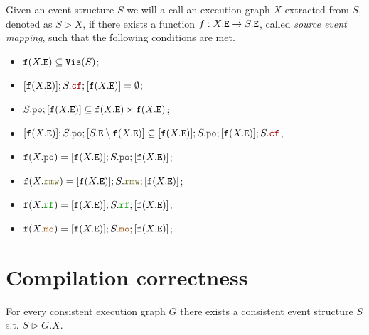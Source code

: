 \documentclass[12pt]{article}
\begin{document}
\begin{definition}
  Given an event structure $S$ we will a call an execution graph $X$
  extracted from $S$, denoted as $S \rhd X$,
  if there exists a function $f : X.{\mathtt{E}} \rightarrow S.{\mathtt{E}}$, called \emph{source event mapping},
  such that the following conditions are met.
  \begin{itemize}
    \item ${\mathtt{f}}(X.{\mathtt{E}}) \subseteq {\mathtt{Vis}}(S)$;
    \item $[\f(X.\lE)];S.\lCF;[\f(X.\lE)] = \emptyset$;
    \item $S.\lPO;[\f(X.\lE)] \subseteq \f(X.\lE) \times \f(X.\lE)$;
    \item $[\f(X.\lE)];S.\lPO;[S.\lE \setminus \f(X.\lE)] \subseteq
           [\f(X.\lE)];S.\lPO;[\f(X.\lE)];S.\lCF$;
    \item $\f(X.\lPO)  = [\f(X.\lE)];S.\lPO; [\f(X.\lE)]$;
    \item $\f(X.\lRMW) = [\f(X.\lE)];S.\lRMW;[\f(X.\lE)]$;
    \item $\f(X.\lRF)  = [\f(X.\lE)];S.\lRF; [\f(X.\lE)]$;
    \item $\f(X.\lMO)  = [\f(X.\lE)];S.\lMO; [\f(X.\lE)]$;
  \end{itemize}
\end{definition}

\section{Compilation correctness}

\begin{theorem}
  For every consistent \imm execution graph $G$
  there exists a consistent event structure $S$
  s.t. $S \rhd G.X$.
\end{theorem}
\end{document}
